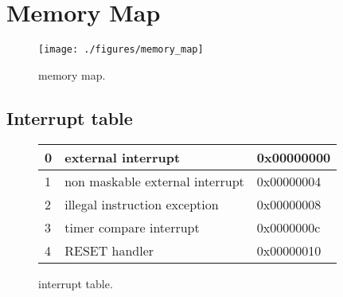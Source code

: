 \chapter{Memory Map}

\begin{figure}[H]
  \centering
  \texttt{[image: ./figures/memory\_map]}
  \caption{\pulpino memory map.}
  \label{fig:pulpino_memory_map}
\end{figure}

\section{Interrupt table}
\begin{figure}[h!]
\centering
	\begin{tabular}{|l|l|l|}
		\hline
		0 & external interrupt & 0x00000000 \\ \hline
		1 & non maskable external interrupt & 0x00000004 \\ \hline
		2 & illegal instruction exception & 0x00000008 \\ \hline
		3 & timer compare interrupt & 0x0000000c \\ \hline
		4 & RESET handler & 0x00000010 \\	\hline
	\end{tabular}
	\caption{\pulpino interrupt table.}
	\label{fig:interrupt_table}
\end{figure}


